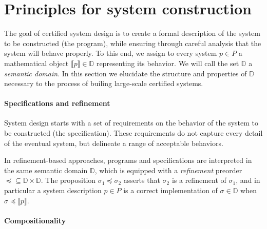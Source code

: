\documentclass[draft,11pt]{report}
\newcommand{\refby}{\preceq}     %
\begin{document}




\section{Principles for system construction} \label{sec:principles} %


The goal of certified system design is
to create a formal description of
the system to be constructed (the program),
while ensuring
through careful analysis
that the system
will behave properly.
To this end,
we assign
to every system $p \in P$
a mathematical object $\llbracket p \rrbracket \in \mathbb{D}$
representing its behavior.
We will call the set $\mathbb{D}$ a \emph{semantic domain}.
In this section we elucidate
the structure and properties of $\mathbb{D}$
necessary to the process of builing
large-scale certified systems.


\paragraph{Specifications and refinement} %

System design starts with a set of requirements
on the behavior of the system to be constructed
(the specification).
These requirements do not capture every detail
of the eventual system,
but delineate a range of acceptable behaviors.

In refinement-based approaches,
programs and specifications are interpreted in the same
semantic domain $\mathbb{D}$,
which is equipped with a \emph{refinement} preorder
${\refby} \subseteq \mathbb{D} \times \mathbb{D}$.
The proposition $\sigma_1 \refby \sigma_2$
asserts that $\sigma_2$ is a refinement of $\sigma_1$,
and in particular a system description $p \in P$ is a correct implementation
of $\sigma \in \mathbb{D}$ when
$\sigma \refby \llbracket p \rrbracket$.


\paragraph{Compositionality} %
\end{document}

